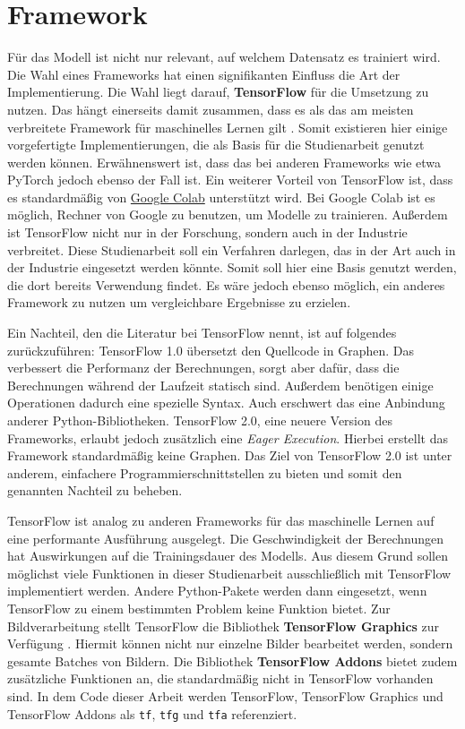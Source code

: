 \section{Framework}

Für das Modell ist nicht nur relevant, auf welchem Datensatz es trainiert wird. Die Wahl eines Frameworks hat einen signifikanten Einfluss die Art der Implementierung. Die Wahl liegt darauf, \textbf{TensorFlow} für die Umsetzung zu nutzen. Das hängt einerseits damit zusammen, dass es als das am meisten verbreitete Framework für maschinelles Lernen gilt \cite{frameworks}. Somit existieren hier einige vorgefertigte Implementierungen, die als Basis für die Studienarbeit genutzt werden können. Erwähnenswert ist, dass das bei anderen Frameworks wie etwa PyTorch jedoch ebenso der Fall ist. Ein weiterer Vorteil von TensorFlow ist, dass es standardmäßig von \href{https://colab.research.google.com/}{Google Colab} unterstützt wird. Bei Google Colab ist es möglich, Rechner von Google zu benutzen, um Modelle zu trainieren. Außerdem ist TensorFlow nicht nur in der Forschung, sondern auch in der Industrie verbreitet. Diese Studienarbeit soll ein Verfahren darlegen, das in der Art auch in der Industrie eingesetzt werden könnte. Somit soll hier eine Basis genutzt werden, die dort bereits Verwendung findet. Es wäre jedoch ebenso möglich, ein anderes Framework zu nutzen um vergleichbare Ergebnisse zu erzielen.

Ein Nachteil, den die Literatur bei TensorFlow nennt, ist auf folgendes zurückzuführen: TensorFlow 1.0 übersetzt den Quellcode in Graphen. Das verbessert die Performanz der Berechnungen, sorgt aber dafür, dass die Berechnungen während der Laufzeit statisch sind. Außerdem benötigen einige Operationen dadurch eine spezielle Syntax. Auch erschwert das eine Anbindung anderer Python-Bibliotheken.  TensorFlow 2.0, eine neuere Version des Frameworks, erlaubt jedoch zusätzlich eine \emph{Eager Execution}. Hierbei erstellt das Framework standardmäßig keine Graphen. Das Ziel von TensorFlow 2.0 ist unter anderem, einfachere Programmierschnittstellen zu bieten und somit den genannten Nachteil zu beheben. \cite{learn-tensorflow} 

TensorFlow ist analog zu anderen Frameworks für das maschinelle Lernen auf eine performante Ausführung ausgelegt. Die Geschwindigkeit der Berechnungen hat Auswirkungen auf die Trainingsdauer des Modells. Aus diesem Grund sollen möglichst viele Funktionen in dieser Studienarbeit ausschließlich mit TensorFlow implementiert werden. Andere Python-Pakete werden dann eingesetzt, wenn TensorFlow zu einem bestimmten Problem keine Funktion bietet. Zur Bildverarbeitung stellt TensorFlow die Bibliothek \textbf{TensorFlow Graphics} zur Verfügung \cite{tensorflow-graphics}. Hiermit können nicht nur einzelne Bilder bearbeitet werden, sondern gesamte Batches von Bildern. Die Bibliothek \textbf{TensorFlow Addons} bietet zudem zusätzliche Funktionen an, die standardmäßig nicht in TensorFlow vorhanden sind. In dem Code dieser Arbeit werden TensorFlow, TensorFlow Graphics und TensorFlow Addons als \texttt{tf}, \texttt{tfg} und \texttt{tfa} referenziert.

